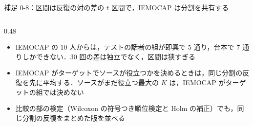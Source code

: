 \begin{frame}{補足 0-8：区間は反復の対の差の $t$ 区間で，IEMOCAP は分割を共有する}
\begin{columns}[T,onlytextwidth]
\begin{column}{0.48\textwidth}
\begin{itemize}
        \item IEMOCAP の 10 人からは，テストの話者の組が即興で 5 通り，台本で 7 通りしかできない．30 回の差は独立でなく，区間は狭すぎる
        \item IEMOCAP がターゲットでソースが役立つかを決めるときは，同じ分割の反復を先に平均する．ソースがまだ役立つ最大の $K$ は，IEMOCAP がターゲットの組では決めない
        \item 比較の部の検定（Wilcoxon の符号つき順位検定と Holm の補正）でも，同じ分割の反復をまとめた版を並べる
      \end{itemize}
    \end{column}
  \end{columns}
\end{frame}
